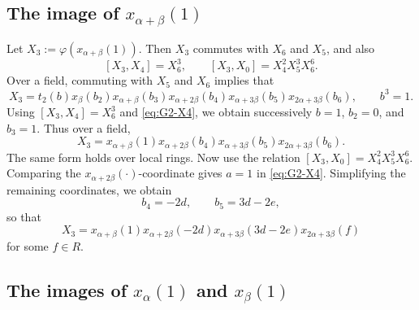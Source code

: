 \documentclass[]{jgcc}
\numberwithin{equation}{section}
\begin{document}
\subsection{\texorpdfstring{The image of $x_{\alpha+\beta}(1)$}{The image of xalpha+beta(1)}}

Let $X_3:=\varphi(x_{\alpha+\beta}(1))$.
Then $X_3$ commutes with $X_6$ and $X_5$, and also
\[
[X_3,X_4]=X_6^3,\qquad [X_3,X_0]=X_4^2X_5^3X_6^6.
\]
Over a field, commuting with $X_5$ and $X_6$ implies that
\[
X_3=t_2(b)x_\beta(b_2)x_{\alpha+\beta}(b_3)x_{\alpha+2\beta}(b_4)x_{\alpha+3\beta}(b_5)x_{2\alpha+3\beta}(b_6),
\qquad b^3=1.
\]
Using $[X_3,X_4]=X_6^3$ and \eqref{eq:G2-X4}, we obtain successively $b=1$, $b_2=0$, and $b_3=1$.
Thus over a field,
\[
X_3=x_{\alpha+\beta}(1)x_{\alpha+2\beta}(b_4)x_{\alpha+3\beta}(b_5)x_{2\alpha+3\beta}(b_6).
\]
The same form holds over local rings.
Now use the relation $[X_3,X_0]=X_4^2X_5^3X_6^6$.
Comparing the $x_{\alpha+2\beta}(\cdot)$-coordinate gives $a=1$ in \eqref{eq:G2-X4}.
Simplifying the remaining coordinates, we obtain
\[
b_4=-2d,\qquad b_5=3d-2e,
\]
so that
\begin{equation}\label{eq:G2-X3}
X_3=x_{\alpha+\beta}(1)x_{\alpha+2\beta}(-2d)x_{\alpha+3\beta}(3d-2e)x_{2\alpha+3\beta}(f)
\end{equation}
for some $f\in R$.

\subsection{\texorpdfstring{The images of $x_\alpha(1)$ and $x_\beta(1)$}{The images of xalpha(1) and xbeta(1)}}
\end{document}
